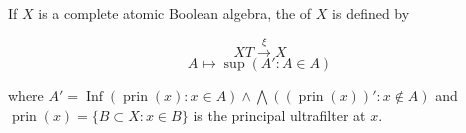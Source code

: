 If $X$ is a complete atomic Boolean algebra, the  of $X$ is defined by

$$XT \xrightarrow{\xi} X$$
$$A \mapsto \sup(A' : A \in A)$$

where $A' = \operatorname{Inf}(\operatorname{prin}(x) : x \in A) \wedge \bigwedge((\operatorname{prin}(x))' : x \notin A)$ and $\operatorname{prin}(x) = \{B \subset X : x \in B\}$ is the principal ultrafilter at $x$.
